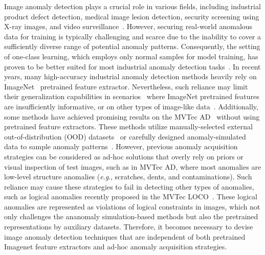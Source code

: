 \documentclass[letterpaper]{article} %
\newcommand{\eg}{\textit{e}.\textit{g}.}
\begin{document}
Image anomaly detection plays a crucial role in various fields, including industrial product defect detection, medical image lesion detection, security screening using X-ray images, and video surveillance~\cite{ComplentaryGAN, MVTecAD, app1, app2, GANomaly}. However, securing real-world anomalous data for training is typically challenging and scarce due to the inability to cover a sufficiently diverse range of potential anomaly patterns. %
Consequently, the setting of one-class learning, which employs only normal samples for model training, has proven to be better suited for most industrial anomaly detection tasks~\cite{MVTecAD, MVloco}.
In recent years, many high-accuracy industrial anomaly detection methods heavily rely on ImageNet~\cite{ImageNet10} pretrained feature extractor. Nevertheless, such reliance may limit their generalization capabilities in scenarios~\cite{MVloco} where ImageNet pretrained features are insufficiently informative, or on other types of image-like data~\cite{mvtec3D, BackTo3dFeatures}. Additionally, some methods have achieved promising results on the MVTec AD~\cite{MVTecAD} without using pretrained feature extractors. These methods utilize manually-selected external out-of-distribution (OOD) datasets~\cite{FCDD} or carefully designed anomaly-simulated data to sample anomaly patterns~\cite{CutPaste, DRAEM, SLSG}. However, previous anomaly acquisition strategies can be considered as ad-hoc solutions that overly rely on priors or visual inspection of test images, such as in MVTec AD, where most anomalies are low-level structure anomalies (\eg, scratches, dents, and contaminations). Such reliance may cause these strategies to fail in detecting other types of anomalies, such as logical anomalies recently proposed in the MVTec LOCO~\cite{MVloco}. These logical anomalies are represented as violations of logical constraints in images, which not only challenges the ananomaly simulation-based methods but also the pretrained representations by auxiliary datasets. Therefore, it becomes necessary to devise image anomaly detection techniques that are independent of both pretrained Imagenet feature extractors and ad-hoc anomaly acquisition strategies.
\end{document}

